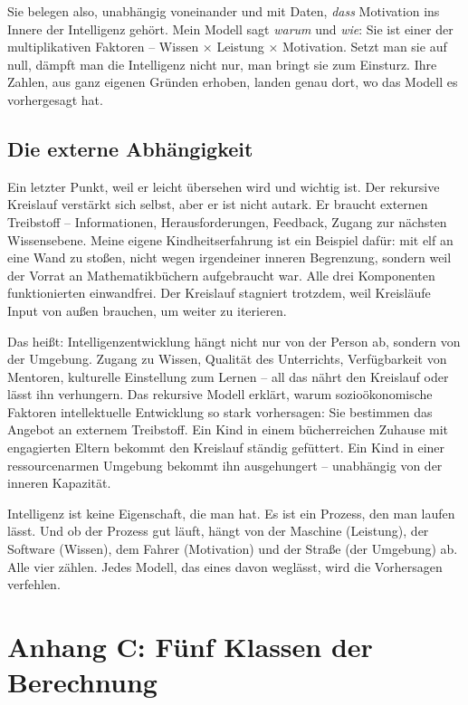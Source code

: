 \documentclass[11pt, twoside, openright]{book}
\begin{document}
Sie belegen also, unabhängig voneinander und mit Daten, \textit{dass} Motivation ins Innere der Intelligenz gehört. Mein Modell sagt \textit{warum} und \textit{wie}: Sie ist einer der multiplikativen Faktoren -- Wissen × Leistung × Motivation. Setzt man sie auf null, dämpft man die Intelligenz nicht nur, man bringt sie zum Einsturz. Ihre Zahlen, aus ganz eigenen Gründen erhoben, landen genau dort, wo das Modell es vorhergesagt hat.

\section*{Die externe Abhängigkeit}

Ein letzter Punkt, weil er leicht übersehen wird und wichtig ist. Der rekursive Kreislauf verstärkt sich selbst, aber er ist nicht autark. Er braucht externen Treibstoff -- Informationen, Herausforderungen, Feedback, Zugang zur nächsten Wissensebene. Meine eigene Kindheitserfahrung ist ein Beispiel dafür: mit elf an eine Wand zu stoßen, nicht wegen irgendeiner inneren Begrenzung, sondern weil der Vorrat an Mathematikbüchern aufgebraucht war. Alle drei Komponenten funktionierten einwandfrei. Der Kreislauf stagniert trotzdem, weil Kreisläufe Input von außen brauchen, um weiter zu iterieren.

Das heißt: Intelligenzentwicklung hängt nicht nur von der Person ab, sondern von der Umgebung. Zugang zu Wissen, Qualität des Unterrichts, Verfügbarkeit von Mentoren, kulturelle Einstellung zum Lernen -- all das nährt den Kreislauf oder lässt ihn verhungern. Das rekursive Modell erklärt, warum sozioökonomische Faktoren intellektuelle Entwicklung so stark vorhersagen: Sie bestimmen das Angebot an externem Treibstoff. Ein Kind in einem bücherreichen Zuhause mit engagierten Eltern bekommt den Kreislauf ständig gefüttert. Ein Kind in einer ressourcenarmen Umgebung bekommt ihn ausgehungert -- unabhängig von der inneren Kapazität.

Intelligenz ist keine Eigenschaft, die man hat. Es ist ein Prozess, den man laufen lässt. Und ob der Prozess gut läuft, hängt von der Maschine (Leistung), der Software (Wissen), dem Fahrer (Motivation) und der Straße (der Umgebung) ab. Alle vier zählen. Jedes Modell, das eines davon weglässt, wird die Vorhersagen verfehlen.

\chapter*{Anhang C: Fünf Klassen der Berechnung}
\end{document}
